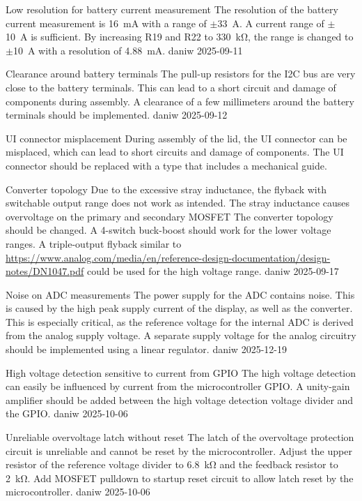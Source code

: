 \begin{ModTable}
\ModItemDone
{Low resolution for battery current measurement}
{The resolution of the battery current measurement is \qty{16}{\milli\ampere} with a range of $\pm$\qty{33}{\ampere}. A current range of $\pm$\qty{10}{\ampere} is sufficient. }
{By increasing R19 and R22 to \qty{330}{\kilo\ohm}, the range is changed to $\pm$\qty{10}{\ampere} with a resolution of \qty{4.88}{\milli\ampere}. }
{daniw}
{2025-09-11}

\ModItemDone
{Clearance around battery terminals}
{The pull-up resistors for the I2C bus are very close to the battery terminals. This can lead to a short circuit and damage of components during assembly. }
{A clearance of a few millimeters around the battery terminals should be implemented. }
{daniw}
{2025-09-12}

\ModItemOpen
{\acs{UI} connector misplacement}
{During assembly of the lid, the \ac{UI} connector can be misplaced, which can lead to short circuits and damage of components. }
{The \ac{UI} connector should be replaced with a type that includes a mechanical guide. }
{}
{}

\ModItemDone
{Converter topology}
{Due to the excessive stray inductance, the flyback with switchable output range does not work as intended. The stray inductance causes overvoltage on the primary and secondary \ac{MOSFET}}
{The converter topology should be changed. A 4-switch buck-boost should work for the lower voltage ranges. A triple-output flyback similar to \url{https://www.analog.com/media/en/reference-design-documentation/design-notes/DN1047.pdf} could be used for the high voltage range. }
{daniw}
{2025-09-17}

\ModItemDone
{Noise on \acs{ADC} measurements}
{The power supply for the \ac{ADC} contains noise. This is caused by the high peak supply current of the display, as well as the converter. This is especially critical, as the reference voltage for the internal \ac{ADC} is derived from the analog supply voltage. }
{A separate supply voltage for the analog circuitry should be implemented using a linear regulator. }
{daniw}
{2025-12-19}

\ModItemDone
{High voltage detection sensitive to current from GPIO}
{The high voltage detection can easily be influenced by current from the microcontroller \ac{GPIO}. }
{A unity-gain amplifier should be added between the high voltage detection voltage divider and the \ac{GPIO}. }
{daniw}
{2025-10-06}

\ModItemDone
{Unreliable overvoltage latch without reset}
{The latch of the overvoltage protection circuit is unreliable and cannot be reset by the microcontroller. }
{Adjust the upper resistor of the reference voltage divider to \qty{6.8}{\kilo\ohm} and the feedback resistor to \qty{2}{\kilo\ohm}. Add \ac{MOSFET} pulldown to startup reset circuit to allow latch reset by the microcontroller. }
{daniw}
{2025-10-06}


\end{ModTable}
